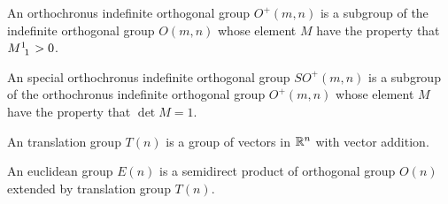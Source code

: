 \documentclass[../main.tex]{subfiles}
\begin{document}
\begin{definition}\label{OrthochronusIndefiniteOrthogonalGroup}
An orthochronus indefinite orthogonal group \(O^{+}\left(m,n\right)\) is a subgroup of the indefinite orthogonal group \(O\left(m,n\right)\) whose element \(M\) have the property that \(\tensor{M}{^1_1}>0\).
\end{definition}
\begin{definition}\label{SpecialOrthochronusIndefiniteOrthogonalGroup}
An special orthochronus indefinite orthogonal group \(SO^{+}\left(m,n\right)\) is a subgroup of the orthochronus indefinite orthogonal group \(O^{+}\left(m,n\right)\) whose element \(M\) have the property that \(\det{M}=1\).
\end{definition}
\begin{definition}\label{TranslationGroup}
An translation group \(T\left(n\right)\) is a group of vectors in \(\mathbb{R}^n\) with vector addition.
\end{definition}
\begin{definition}\label{EuclideanGroup}
An euclidean group \(E\left(n\right)\) is a semidirect product of orthogonal group \(O\left(n\right)\) extended by translation group \(T\left(n\right)\).
\end{definition}
\end{document}
